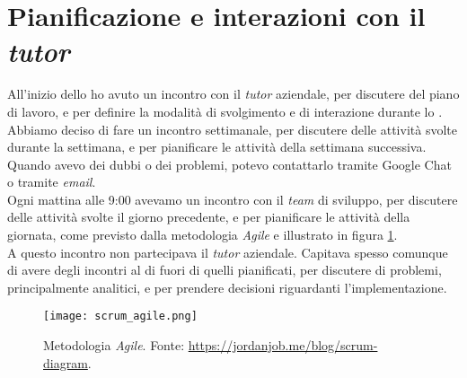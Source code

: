 \section{Pianificazione e interazioni con il \textit{tutor}}
All'inizio dello \stage{} ho avuto un incontro con il \textit{tutor} aziendale, per discutere del piano di lavoro, e per definire la modalità
di svolgimento e di interazione durante lo \stage.\\
Abbiamo deciso di fare un incontro settimanale, per discutere delle attività svolte durante la settimana, e per pianificare le attività
della settimana successiva.\\
Quando avevo dei dubbi o dei problemi, potevo contattarlo tramite Google Chat o tramite \textit{email}.\\
Ogni mattina alle 9:00 avevamo un incontro con il \textit{team} di sviluppo, per discutere delle attività svolte il giorno precedente, e per
pianificare le attività della giornata, come previsto dalla metodologia \textit{Agile} e illustrato in figura \ref*{fig:scrum_agile}.\\
A questo incontro non partecipava il \textit{tutor} aziendale. 
Capitava spesso comunque di avere degli incontri al di fuori di quelli pianificati, per discutere di problemi, principalmente analitici, 
e per prendere decisioni riguardanti l'implementazione.\\

\begin{figure}[h] 
  \centering 
  \texttt{[image: scrum\_agile.png]} 
  \caption[Metodologia \textit{Agile}]{Metodologia \textit{Agile}. Fonte: \url{https://jordanjob.me/blog/scrum-diagram}. }
  \label{fig:scrum_agile}
\end{figure}